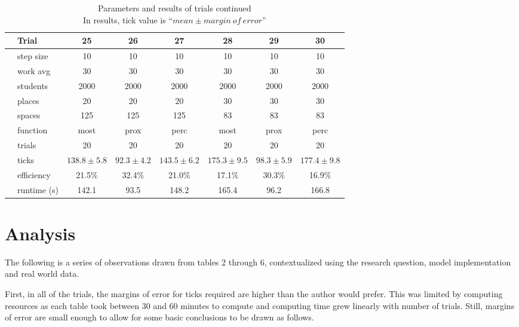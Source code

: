 \documentclass[11pt]{article} %
\begin{document}
\begin{table}[]
\footnotesize
\centering
\begin{tabular}{l|l|ccc|ccc}
 & Trial & 25 & 26 & 27 & 28 & 29 & 30  \\ \hline
  \parbox[t]{2mm}{} 
 & step size 	& 10  			& 10  			& 10 			& 10 					& 10 				& 10  \\
 & work avg 	& 30 			&  30 			& 30			& 30 					& 30 				& 30 \\
 & students 	& 2000 			& 2000 			& 2000 			& 2000 					& 2000 				& 2000 \\
 & places 		& 20 			& 20 			& 20 			& 30 					& 30 				& 30 \\
 & spaces 		& 125 			& 125 			& 125 			& 83 					& 83 				& 83 \\
 & function 	& most 			& prox 			& perc 			& most 					& prox 				& perc \\
 & trials 		& 20 			& 20 			& 20 			& 20 					& 20 				& 20 \\ \hline
\parbox[t]{2mm}{} 
 & ticks 		& $138.8\pm 5.8$ 	& $92.3\pm 4.2 $ 	& $ 143.5\pm 6.2 $	& $175.3\pm 9.5 $	& $98.3\pm 5.9 $	& $177.4\pm 9.8 $ \\
 & efficiency 	& 21.5\%		& 32.4\%		& 21.0\%			& 17.1\%		& 30.3\%		& 16.9\% \\
 & runtime (s) 	& 142.1		&	93.5		& 	148.2		& 165.4			& 96.2			& 166.8
\end{tabular}
\caption{Parameters and results of trials continued \\ \footnotesize In results, tick value is ``$mean \pm margin \: of \: error$''}
\end{table}


\pagebreak

\section{Analysis}

The following is a series of observations drawn from tables 2 through 6, contextualized using the research question, model implementation and real world data. 

First, in all of the trials, the margins of error for ticks required are higher than the author would prefer. This was limited by computing resources as each table took between 30 and 60 minutes to compute and computing time grew linearly with number of trials. Still, margins of error are small enough to allow for some basic conclusions to be drawn as follows. 
\end{document}
